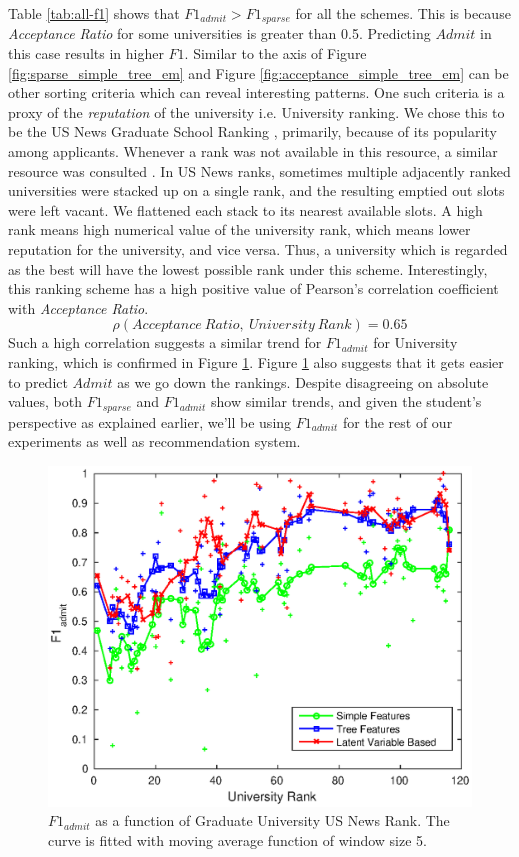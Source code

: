 \documentclass{sig-alternate-05-2015}
\begin{document}
Table \ref{tab:all-f1} shows that $F1_{admit} > F1_{sparse}$ for all the schemes. This is because \textit{Acceptance Ratio} for some universities is greater than 0.5. Predicting $Admit$ in this case results in higher $F1$. Similar to the axis of Figure \ref{fig:sparse_simple_tree_em} and Figure \ref{fig:acceptance_simple_tree_em} can be other sorting criteria which can reveal interesting patterns. One such criteria is a proxy of the \textit{reputation} of the university i.e. University ranking. We chose this to be the US News Graduate School Ranking \cite{usnews}, primarily, because of its popularity among applicants. Whenever a rank was not available in this resource, a similar resource was consulted \cite{qs, shanghai, webometrics}. In US News ranks, sometimes multiple adjacently ranked universities were stacked up on a single rank, and the resulting emptied out slots were left vacant. We flattened each stack to its nearest available slots. A high rank means high numerical value of the university rank, which means lower reputation for the university, and vice versa. Thus, a university which is regarded as the best will have the lowest possible rank under this scheme. Interestingly, this ranking scheme has a high positive value of Pearson's correlation coefficient with \textit{Acceptance Ratio}.
$$\rho(Acceptance~Ratio,~University~Rank) = 0.65$$
Such a high correlation suggests a similar trend for $F1_{admit}$ for University ranking, which is confirmed in Figure \ref{fig:rank_simple_tree_em}. Figure \ref{fig:rank_simple_tree_em} also suggests that it gets easier to predict $Admit$ as we go down the rankings. Despite disagreeing on absolute values, both $F1_{sparse}$ and $F1_{admit}$ show similar trends, and given the student's perspective as explained earlier, we'll be using $F1_{admit}$ for the rest of our experiments as well as recommendation system.

\begin{figure}[t]
\centering
\includegraphics[scale=0.6]{rank_vs_simple_tree_em.eps}
\caption{$F1_{admit}$ as a function of Graduate University US News Rank.
The curve is fitted with moving average function of window size 5.}
\label{fig:rank_simple_tree_em}
\end{figure}
\end{document}
